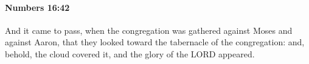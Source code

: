 
		\paragraph{Numbers 16:42} %
			\label{NUMBERS-16-42}

			And it came to pass, when the congregation was gathered against Moses and against Aaron, that they looked toward the tabernacle of the congregation: and, behold, the cloud covered it, and the glory of the LORD appeared.


